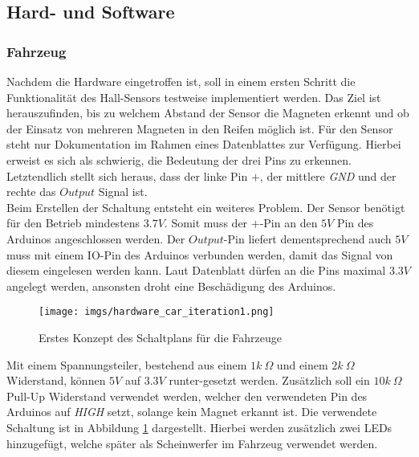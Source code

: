\documentclass[.../Dokumentation.tex]{subfiles}
\begin{document}
\subsection{Hard- und Software}
\label{sec-ita1-hardware}

\subsubsection*{Fahrzeug}
Nachdem die Hardware eingetroffen ist, soll in einem ersten Schritt 
die Funktionalität des Hall-Sensors testweise implementiert werden. Das Ziel 
ist herauszufinden, bis zu welchem Abstand der Sensor die Magneten erkennt und 
ob der Einsatz von mehreren Magneten in den Reifen möglich ist. Für den Sensor 
steht nur Dokumentation im Rahmen eines Datenblattes zur Verfügung. Hierbei erweist es sich als schwierig, die Bedeutung der drei Pins zu 
erkennen. Letztendlich stellt sich heraus, dass der linke Pin $+$, der 
mittlere \textit{GND} und der rechte das $Output$ Signal ist.\\
Beim Erstellen der Schaltung entsteht ein weiteres Problem. Der Sensor benötigt für den Betrieb mindestens $3.7V$. Somit muss der $+$-Pin an den $5V$ Pin des 
Arduinos angeschlossen werden. Der $Output$-Pin liefert dementsprechend auch $5V$ muss mit einem IO-Pin des Arduinos verbunden werden, damit das 
Signal von diesem eingelesen werden kann. Laut Datenblatt dürfen an die Pins maximal $3.3V$ angelegt werden, ansonsten droht eine Beschädigung des Arduinos.
\begin{figure}[H]
\begin{center}
    \texttt{[image: imgs/hardware\_car\_iteration1.png]}
    \caption{Erstes Konzept des Schaltplans für die Fahrzeuge}
    \label{fig-hardware-car-iteration1}
\end{center}
\end{figure}
\noindent
Mit einem Spannungsteiler, bestehend aus einem $1k\ \Omega$ und einem $2k\ \Omega$ Widerstand, können $5V$ 
auf $3.3V$ runter-gesetzt werden. Zusätzlich soll ein 
$10k\ \Omega$ Pull-Up Widerstand verwendet werden, welcher den verwendeten Pin 
des Arduinos auf \textit{HIGH} setzt, solange kein Magnet erkannt ist. Die verwendete Schaltung ist in Abbildung \ref{fig-hardware-car-iteration1} dargestellt. 
Hierbei werden zusätzlich zwei LEDs hinzugefügt, welche später als Scheinwerfer im Fahrzeug verwendet werden. 
\end{document}
